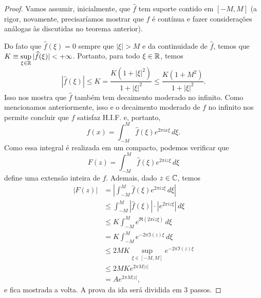         \begin{proof}
            Vamos assumir, inicialmente, que $\widehat{f}$ tem suporte contido em $[-M,M]$ 
            (a rigor, novamente, precisaríamos mostrar que $\widehat{f}$ é contínua e fazer
            considerações análogas às discutidas no teorema anterior).
            
            Do fato que $\widehat{f}(\xi) = 0$ sempre que $|\xi| > M$ e da continuidade de $\widehat{f}$, 
            temos que $\displaystyle{ K\equiv \sup_{\xi\in\mathbb{R}} |\widehat{f}(\xi)| < +\infty }$.
            Portanto, para todo $\xi\in\mathbb{R}$, temos
            \begin{equation*}
                |\widehat{f}(\xi)| \leq K = \frac{K(1+|\xi|^2)}{1+|\xi|^2} \leq \frac{K(1 + M^2)}{1+|\xi|^2}.
            \end{equation*}
            Isso nos mostra que $\widehat{f}$ também tem decaimento moderado no infinito. Como 
            mencionamos anteriormente, isso e o decaimento moderado de $f$ no infinito nos permite
            concluir que $f$ satisfaz H.I.F. e, portanto,
            \begin{equation*}
                f(x) = \int_{-M}^M \widehat{f}(\xi) e^{2\pi ix\xi} \, d\xi.
            \end{equation*}
            Como essa integral é realizada em um compacto, podemos verificar que
            \begin{equation*}
                F(z) = \int_{-M}^M \widehat{f}(\xi) e^{2\pi iz\xi} \, d\xi
            \end{equation*}
            define uma extensão inteira de $f$. Ademais, dado $z\in\mathbb{C}$, temos
            \begin{align*}
                |F(z)| &= \left| \int_{-M}^M \widehat{f}(\xi) e^{2\pi iz\xi} \, d\xi \right| \\
                       &\leq \int_{-M}^M |\widehat{f}(\xi)|\cdot|e^{2\pi iz\xi}| \, d\xi \\
                       &\leq K \int_{-M}^M e^{\Re(2\pi iz\xi)} \, d\xi \\
                       &= K \int_{-M}^M e^{-2\pi\Im(z)\xi} \, d\xi \\
                       &\leq 2MK \sup_{\xi\in[-M,M]} e^{-2\pi\Im(z)\xi} \\
                       &\leq 2MKe^{2\pi M|z|} \\
                       &= Ae^{2\pi M|z|},
            \end{align*}
            e fica mostrada a volta. A prova da ida será dividida em 3 passos.

\end{proof}
